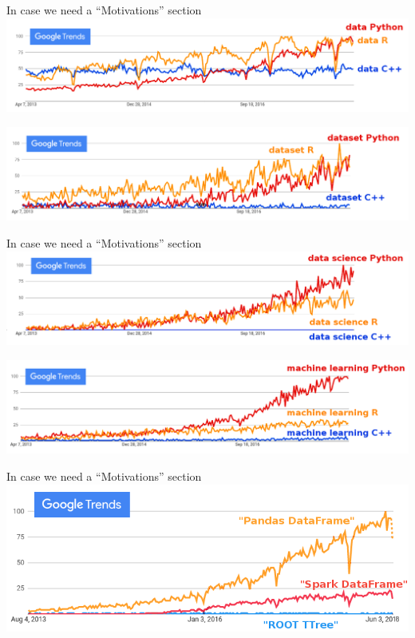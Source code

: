 \documentclass[aspectratio=169]{beamer}
\begin{document}
\begin{frame}{In case we need a ``Motivations'' section}
\vspace{0.5 cm}
\includegraphics[width=\linewidth]{python-r-cpp-googletrends-data.png}

\vspace{1 cm}
\includegraphics[width=\linewidth]{python-r-cpp-googletrends-dataset.png}
\end{frame}

\begin{frame}{In case we need a ``Motivations'' section}
\vspace{0.5 cm}
\includegraphics[width=\linewidth]{python-r-cpp-googletrends-datascience.png}

\vspace{1 cm}
\includegraphics[width=\linewidth]{python-r-cpp-googletrends-machinelearning.png}
\end{frame}

\begin{frame}{In case we need a ``Motivations'' section}
\vspace{0.5 cm}
\includegraphics[width=\linewidth]{root-spark-pandas-google-trends.png}
\end{frame}
\end{document}
